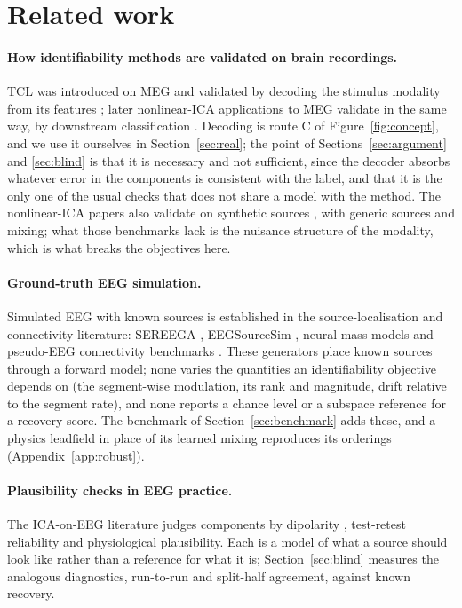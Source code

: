 \section{Related work}
\label{sec:related}

\paragraph{How identifiability methods are validated on brain recordings.}
TCL was introduced on MEG and validated by decoding the stimulus modality from its features \citep{hyvarinen2016tcl}; later nonlinear-ICA applications to MEG validate in the same way, by downstream classification \citep{halva2021snica,zhu2023unsupervised}.
Decoding is route C of Figure~\ref{fig:concept}, and we use it ourselves in Section~\ref{sec:real}; the point of Sections~\ref{sec:argument} and \ref{sec:blind} is that it is necessary and not sufficient, since the decoder absorbs whatever error in the components is consistent with the label, and that it is the only one of the usual checks that does not share a model with the method.
The nonlinear-ICA papers also validate on synthetic sources \citep{hyvarinen2016tcl,khemakhem2020ivae}, with generic sources and mixing; what those benchmarks lack is the nuisance structure of the modality, which is what breaks the objectives here.

\paragraph{Ground-truth EEG simulation.}
Simulated EEG with known sources is established in the source-localisation and connectivity literature: SEREEGA \citep{krol2018sereega}, EEGSourceSim \citep{barzegaran2019eegsourcesim}, neural-mass models \citep{jansen1995electroencephalogram} and pseudo-EEG connectivity benchmarks \citep{haufe2019simulation}.
These generators place known sources through a forward model; none varies the quantities an identifiability objective depends on (the segment-wise modulation, its rank and magnitude, drift relative to the segment rate), and none reports a chance level or a subspace reference for a recovery score.
The benchmark of Section~\ref{sec:benchmark} adds these, and a physics leadfield in place of its learned mixing reproduces its orderings (Appendix~\ref{app:robust}).

\paragraph{Plausibility checks in EEG practice.}
The ICA-on-EEG literature judges components by dipolarity \citep{delorme2012dipolar}, test-retest reliability and physiological plausibility.
Each is a model of what a source should look like rather than a reference for what it is; Section~\ref{sec:blind} measures the analogous diagnostics, run-to-run and split-half agreement, against known recovery.

